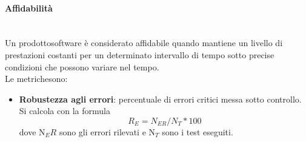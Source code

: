 	\paragraph{Affidabilità} \mbox{}\\[1mm]
	Un prodotto\glosp software è considerato affidabile quando mantiene un livello di prestazioni costanti per un determinato intervallo di tempo sotto precise condizioni che possono variare nel tempo.\\
	Le metriche\glosp sono:
	\begin{itemize}
		\item \textbf{Robustezza agli errori}: percentuale di errori critici messa sotto controllo. Si calcola con la formula
		\[R_E=N_{ER}/N_{T}*100\]
		dove N$_ER$ sono gli errori rilevati e N$_T$ sono i test eseguiti.
	\end{itemize}
